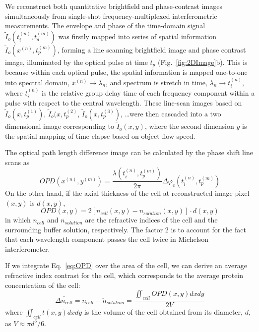 \documentclass[aps,pra,reprint,superscriptaddress]{revtex4-1}
\begin{document}
We reconstruct both quantitative brightfield and phase-contrast images simultaneously from single-shot frequency-multiplexed interferometric measurements. The envelope and phase of the time-domain signal $\tilde{I}_o (t_i^{(n)}, t_d^{(m)})$ was firstly mapped into series of spatial information $\tilde{I}_o(x^{(n)},t_p^{(m)})$, forming a line scanning brightfield image and phase contrast image, illuminated by the optical pulse at time $t_p$ (Fig.~\ref{fig:2DImage}b). This is because within each optical pulse, the spatial information is mapped one-to-one into spectral domain, $x^{(n)} \rightarrow \lambda_n$, and spectrum is stretch in time, $\lambda_n \rightarrow t_i^{(n)}$, where $t_i^{(n)}$ is the relative group delay time of each frequency component within a pulse with respect to the central wavelength. These line-scan images based on $\tilde{I}_o(x,t_p^{(1)})$, $\tilde{I}_o (x, t_p^{(2)}$, $\tilde{I}_o(x,t_p^{(3)})$, \ldots were then cascaded into a two dimensional image corresponding to $\tilde{I}_o(x,y)$, where the second dimension $y$ is the spatial mapping of time elapse based on object flow speed. 

The optical path length difference image can be calculated by the phase shift line scans as
\begin{equation}
OPD(x^{(n)},y^{(m)}) = \frac{\lambda(t_i^{(n)},t_p^{(m)})}{2\pi} \Delta\varphi_c(t_i^{(n)},t_p^{(m)})
\end{equation}
On the other hand, if the axial thickness of the cell at reconstructed image pixel $(x,y)$ is $d(x,y)$,
\begin{equation} \label{eq:OPD}
OPD(x,y) = 2 [n_{cell}(x,y) - n_{solution}(x,y)] \cdot d(x,y)
\end{equation}
in which $n_{cell}$ and $n_{solution}$ are the refractive indices of the cell and the surrounding buffer solution, respectively. The factor 2 is to account for the fact that each wavelength component passes the cell twice in Michelson interferometer. 

If we integrate Eq.~\ref{eq:OPD} over the area of the cell, we can derive an average refractive index contrast for the cell, which corresponds to the average protein concentration of the cell:
\begin{equation}
\overline{\Delta n_{cell}} = \overline{n_{cell} - n_{solution}} = \frac{\iint_{cell} OPD(x,y) dx dy}{2 V}
\end{equation}
where $\iint_{cell} t(x,y) dx dy$ is the volume of the cell obtained from its diameter, $d$, as $V \approx \pi d^3/6$. 
\end{document}
